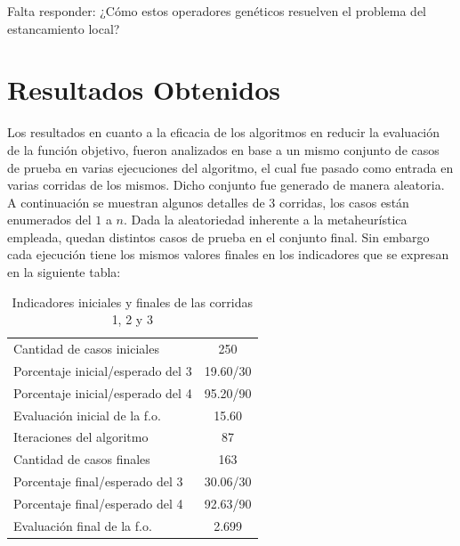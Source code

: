 \documentclass[a4paper,12pt]{book}
\begin{document}
		Falta responder: ¿Cómo estos operadores genéticos resuelven el problema del estancamiento local?
	
	
\chapter{Resultados Obtenidos}
	Los resultados en cuanto a la eficacia de los algoritmos en reducir la evaluación de la función objetivo, fueron analizados en base a un mismo conjunto de casos de prueba en varias ejecuciones del algoritmo, el cual fue pasado como entrada en varias corridas de los mismos. Dicho conjunto fue generado de manera aleatoria. \\
	
	A continuación se muestran algunos detalles de 3 corridas, los casos están enumerados del $1$ a $n$. Dada la aleatoriedad inherente a la metaheurística empleada, quedan distintos casos de prueba en el conjunto final. Sin embargo cada ejecución tiene los mismos valores finales en los indicadores que se expresan en la siguiente tabla:
	
	\begin{table}[h]
		\begin{center}
			\begin{tabular}{| l | c |} \hline
				Cantidad de casos iniciales & 250 \\
				Porcentaje inicial/esperado del 3 & 19.60/30 \\
				Porcentaje inicial/esperado del 4 & 95.20/90 \\
				Evaluación inicial de la f.o. & 15.60 \\ \hline
				Iteraciones del algoritmo & 87 \\ \hline
				Cantidad de casos finales & 163 \\
				Porcentaje final/esperado del 3 & 30.06/30 \\
				Porcentaje final/esperado del 4 & 92.63/90 \\
				Evaluación final de la f.o. & 2.699 \\ \hline
			\end{tabular}
			\caption{Indicadores iniciales y finales de las corridas 1, 2 y 3}
			\label{tab:IndicadoresGRASP123}
		\end{center}
	\end{table}
\end{document}
